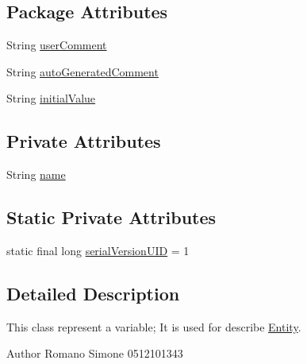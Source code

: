 \subsection*{Package Attributes}
\begin{DoxyCompactItemize}
\item 
String \hyperlink{classit_1_1isislab_1_1masonassisteddocumentation_1_1_o_d_d_1_1_variable_a884cf9e8bd7fc7fca3391d3f4954e483}{user\-Comment}
\item 
String \hyperlink{classit_1_1isislab_1_1masonassisteddocumentation_1_1_o_d_d_1_1_variable_a8d4c06905b054fc8ece5f5af52dfdc24}{auto\-Generated\-Comment}
\item 
String \hyperlink{classit_1_1isislab_1_1masonassisteddocumentation_1_1_o_d_d_1_1_variable_a3113358fdb645ecec970e6c48d7a5aed}{initial\-Value}
\end{DoxyCompactItemize}
\subsection*{Private Attributes}
\begin{DoxyCompactItemize}
\item 
String \hyperlink{classit_1_1isislab_1_1masonassisteddocumentation_1_1_o_d_d_1_1_variable_ac9b7d43d71c2021e449fa8013ba8254b}{name}
\end{DoxyCompactItemize}
\subsection*{Static Private Attributes}
\begin{DoxyCompactItemize}
\item 
static final long \hyperlink{classit_1_1isislab_1_1masonassisteddocumentation_1_1_o_d_d_1_1_variable_a33eb58c0a40581dd0960a8c9ac3dcb02}{serial\-Version\-U\-I\-D} = 1
\end{DoxyCompactItemize}


\subsection{Detailed Description}
This class represent a variable; It is used for describe \hyperlink{classit_1_1isislab_1_1masonassisteddocumentation_1_1_o_d_d_1_1_entity}{Entity}. \begin{DoxyAuthor}{Author}
Romano Simone 0512101343 
\end{DoxyAuthor}


